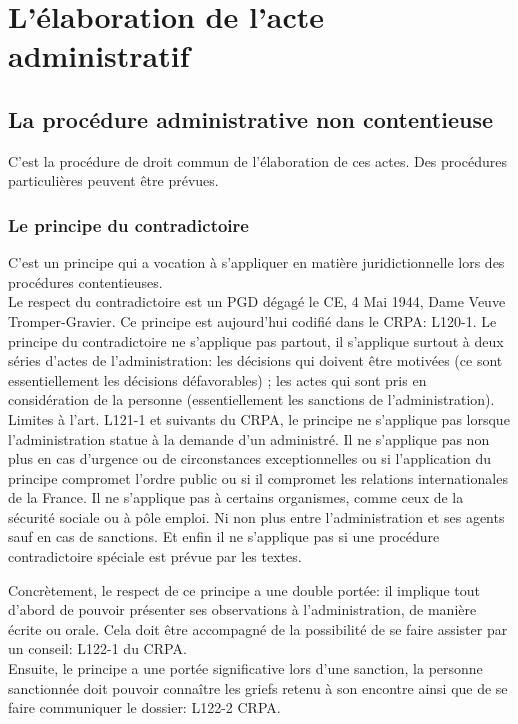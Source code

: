 \documentclass[10pt, a4paper, openany]{book}
\begin{document}
\section{L'élaboration de l'acte administratif}

\subsection{La procédure administrative non contentieuse}

C'est la procédure de droit commun de l'élaboration de ces actes. Des procédures particulières peuvent être prévues. 

\subsubsection{Le principe du contradictoire}

C'est un principe qui a vocation à s'appliquer en matière juridictionnelle lors des procédures contentieuses. \\
Le respect du contradictoire est un PGD dégagé le CE, 4 Mai 1944, Dame Veuve Tromper-Gravier. Ce principe est aujourd'hui codifié dans le CRPA: L120-1. Le principe du contradictoire ne s'applique pas partout, il s'applique surtout à deux séries d'actes de l'administration: les décisions qui doivent être motivées (ce sont essentiellement les décisions défavorables) ; les actes qui sont pris en considération de la personne (essentiellement les sanctions de l'administration). \\
Limites à  l'art. L121-1 et suivants du CRPA, le principe ne s'applique pas lorsque l'administration statue à la demande d'un administré. Il ne s'applique pas non plus en cas d'urgence ou de circonstances exceptionnelles ou si l'application du principe compromet l'ordre public ou si il compromet les relations internationales de la France. Il ne s'applique pas à certains organismes, comme ceux de la sécurité sociale ou à pôle emploi. Ni non plus entre l'administration et ses agents sauf en cas de sanctions. Et enfin il ne s'applique pas si une procédure contradictoire spéciale est prévue par les textes.


Concrètement, le respect de ce principe a une double portée: il implique tout d'abord de pouvoir présenter ses observations à l'administration, de manière écrite ou orale. Cela doit être accompagné de la possibilité de se faire assister par un conseil: L122-1 du CRPA. \\
Ensuite, le principe a une portée significative lors d'une sanction, la personne sanctionnée doit pouvoir connaître les griefs retenu à son encontre ainsi que de se faire communiquer le dossier: L122-2 CRPA.
\end{document}
